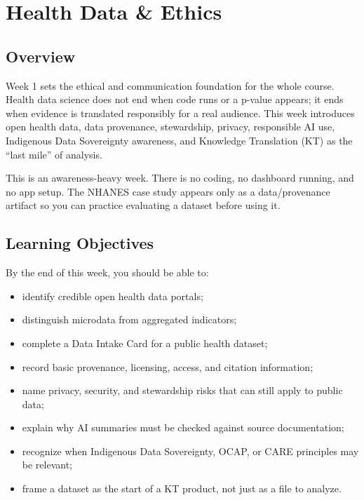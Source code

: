 \documentclass[
  letterpaper,
  DIV=11,
  numbers=noendperiod,
  oneside]{scrreprt}
\providecommand{\tightlist}{%
  \setlength{\itemsep}{0pt}\setlength{\parskip}{0pt}}
\begin{document}
\chapter*{Health Data \& Ethics}\label{health-data-ethics}


\section*{Overview}\label{overview}


Week 1 sets the ethical and communication foundation for the whole
course. Health data science does not end when code runs or a p-value
appears; it ends when evidence is translated responsibly for a real
audience. This week introduces open health data, data provenance,
stewardship, privacy, responsible AI use, Indigenous Data Sovereignty
awareness, and Knowledge Translation (KT) as the ``last mile'' of
analysis.

This is an awareness-heavy week. There is no coding, no dashboard
running, and no app setup. The NHANES case study appears only as a
data/provenance artifact so you can practice evaluating a dataset before
using it.

\section*{Learning Objectives}\label{learning-objectives}


By the end of this week, you should be able to:

\begin{itemize}
\tightlist
\item
  identify credible open health data portals;
\item
  distinguish microdata from aggregated indicators;
\item
  complete a Data Intake Card for a public health dataset;
\item
  record basic provenance, licensing, access, and citation information;
\item
  name privacy, security, and stewardship risks that can still apply to
  public data;
\item
  explain why AI summaries must be checked against source documentation;
\item
  recognize when Indigenous Data Sovereignty, OCAP, or CARE principles
  may be relevant;
\item
  frame a dataset as the start of a KT product, not just as a file to
  analyze.
\end{itemize}
\end{document}
